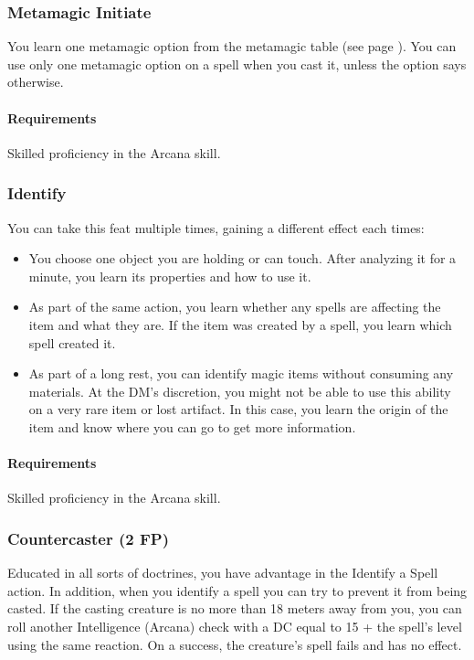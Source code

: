 \subsubsection{Metamagic Initiate} \label{feat::metamagicinitiate}
    You learn one metamagic option from the metamagic table (see page \pageref{ssec::metamagic}).
    You can use only one metamagic option on a spell when you cast it, unless the option says otherwise.
    \paragraph{Requirements} Skilled proficiency in the Arcana skill.
\subsubsection{Identify} \label{feat::identify}
    You can take this feat multiple times, gaining a different effect each times:
    \begin{itemize}
        \item You choose one object you are holding or can touch.
        After analyzing it for a minute, you learn its properties and how to use it.
        \item As part of the same action, you learn whether any spells are affecting the item and what they are.
        If the item was created by a spell, you learn which spell created it.
        \item As part of a long rest, you can identify magic items without consuming any materials.
        At the DM's discretion, you might not be able to use this ability on a very rare item or lost artifact.
        In this case, you learn the origin of the item and know where you can go to get more information.
    \end{itemize}
    \paragraph{Requirements} Skilled proficiency in the Arcana skill.
\subsubsection{Countercaster (2 FP)} \label{feat::countercaster}
    Educated in all sorts of doctrines, you have advantage in the Identify a Spell action.
    In addition, when you identify a spell you can try to prevent it from being casted.
    If the casting creature is no more than 18 meters away from you, you can roll another Intelligence (Arcana) check with a DC equal to 15 + the spell's level using the same reaction.
    On a success, the creature's spell fails and has no effect.
